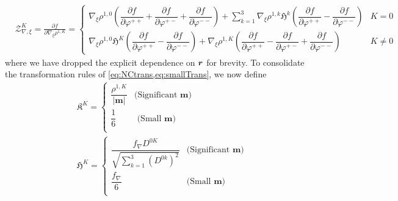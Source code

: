 \begin{subequations}
\label{eq:ZvarphiVar}
\begin{align}
&\mathcal{Z}^K_{\nabla,\xi} = \frac{\partial f}{\partial \nabla_\xi \rho^{1,K}} = \begin{cases}
                                                          \nabla_\xi\rho^{1,0}    \left(  \dfrac{\partial f}{\partial \varphi^{++}} + \dfrac{\partial f}{\partial \varphi^{+-}} + \dfrac{\partial f}{\partial \varphi^{--}} \right)  
                                                          + \sum_{k=1}^3 \nabla_\xi \rho^{1,k} \mathfrak H^k 
                                                          \left( \dfrac{\partial f}{\partial \varphi^{++}} - \dfrac{\partial f}{\partial \varphi^{--}} 
                                                          \right)                                                          
                                                          & K= 0 \\[8pt]                                                                                                        
                                                          \nabla_\xi\rho^{1,0} \mathfrak H^K  \left( \dfrac{\partial f}{\partial \varphi^{++}} - \dfrac{\partial f}{\partial \varphi^{--}} \right) 
                                                          + \nabla_\xi\rho^{1,K}
                                                          \left(\dfrac{\partial f}{\partial \varphi^{++}} - \dfrac{\partial f}{\partial \varphi^{+-}} + \dfrac{\partial f}{\partial \varphi^{--}}
                                                           \right)
                                                          & K \neq 0
                                                        \end{cases}                                                                                                                                     
\end{align}
\end{subequations}
where we have dropped the explicit dependence on $\boldsymbol{r}$ for brevity. To consolidate the transformation rules of 
\cref{eq:NCtrans,eq:smallTrans}, we now define
\begin{subequations}
\begin{align}
&\mathfrak K^K = 
\begin{cases}
  \dfrac{\rho^{1,K}}{\vert \mathbf{m} \vert} & \text{(Significant }\mathbf{m}\text{)} \\[20pt]
  \dfrac{1}{6} & \text{ (Small }\mathbf{m}\text{)} \\[12pt]
\end{cases}\\
&\mathfrak H^K = 
\begin{cases}
  \dfrac{f_\nabla D^{0K} }{\sqrt{\sum_{k=1}^3 \left(D^{0k}\right)^2   }} & \text{(Significant }\mathbf{m}\text{)} \\[20pt]
  \dfrac{f_\nabla}{6} & \text{(Small }\mathbf{m}\text{)} \\[12pt]
\end{cases}
\end{align}
\end{subequations}


